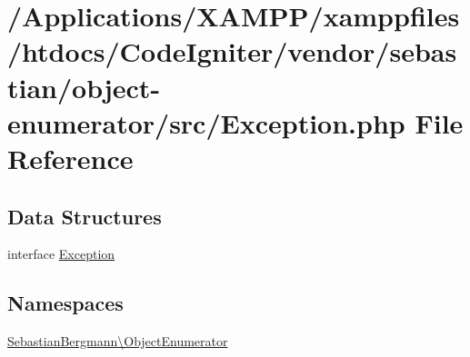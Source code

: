 \hypertarget{sebastian_2object-enumerator_2src_2_exception_8php}{}\section{/\+Applications/\+X\+A\+M\+P\+P/xamppfiles/htdocs/\+Code\+Igniter/vendor/sebastian/object-\/enumerator/src/\+Exception.php File Reference}
\label{sebastian_2object-enumerator_2src_2_exception_8php}
\subsection*{Data Structures}
\begin{DoxyCompactItemize}
\item 
interface \mbox{\hyperlink{interface_sebastian_bergmann_1_1_object_enumerator_1_1_exception}{Exception}}
\end{DoxyCompactItemize}
\subsection*{Namespaces}
\begin{DoxyCompactItemize}
\item 
 \mbox{\hyperlink{namespace_sebastian_bergmann_1_1_object_enumerator}{Sebastian\+Bergmann\textbackslash{}\+Object\+Enumerator}}
\end{DoxyCompactItemize}
